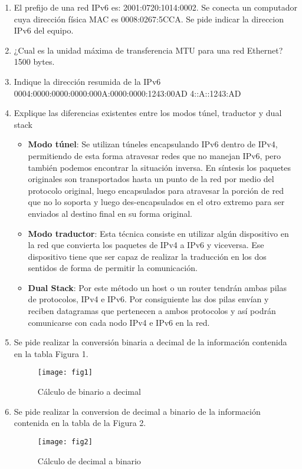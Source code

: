 \documentclass{udparticle}
\begin{document}
\begin{enumerate}
\item El prefijo de una red IPv6 es: 2001:0720:1014:0002. Se conecta un
computador cuya dirección física MAC es 0008:0267:5CCA. Se pide indicar la direccion IPv6 del equipo.
\item ¿Cual es la unidad máxima de transferencia MTU para una red Ethernet?
	1500 bytes.
\item Indique la dirección resumida de la IPv6 0004:0000:0000:0000:000A:0000:0000:1243:00AD
	4::A::1243:AD
\item Explique las diferencias existentes entre los modos túnel, traductor y dual stack
\begin{itemize}
	\item {\bf Modo túnel}: Se utilizan túneles encapsulando IPv6 dentro de IPv4, permitiendo de esta forma atravesar redes que no manejan IPv6, pero también podemos encontrar la situación inversa. En síntesis los paquetes originales son transportados hasta un punto de la red por medio del protocolo original, luego encapsulados para atravesar la porción de red que no lo soporta y luego des-encapsulados en el otro extremo para ser enviados al destino final en su forma original.
	\item {\bf Modo traductor}: Esta técnica consiste en utilizar algún dispositivo en la red que convierta los paquetes de IPv4 a IPv6 y viceversa. Ese dispositivo tiene que ser capaz de realizar la traducción en los dos sentidos de forma de permitir la comunicación.
	\item {\bf Dual Stack}: Por este método un host o un router tendrán ambas pilas de protocolos, IPv4 e IPv6. Por consiguiente las dos pilas envían y reciben datagramas que pertenecen a ambos protocolos y así podrán comunicarse con cada nodo IPv4 e IPv6 en la red.
\end{itemize}
\clearpage
\item Se pide realizar la conversión binaria a decimal de la información contenida en la tabla Figura 1.
	\begin{figure}[H]
	\centering
	\texttt{[image: fig1]}
	\caption{Cálculo de binario a decimal}
	\end{figure}
\clearpage

\item Se pide realizar la conversion de decimal a binario de la información contenida en la tabla de la Figura 2.
	\begin{figure}[H]
	\centering
	\texttt{[image: fig2]}
	\caption{Cálculo de decimal a binario}
	\end{figure}


\end{enumerate}
\end{document}
